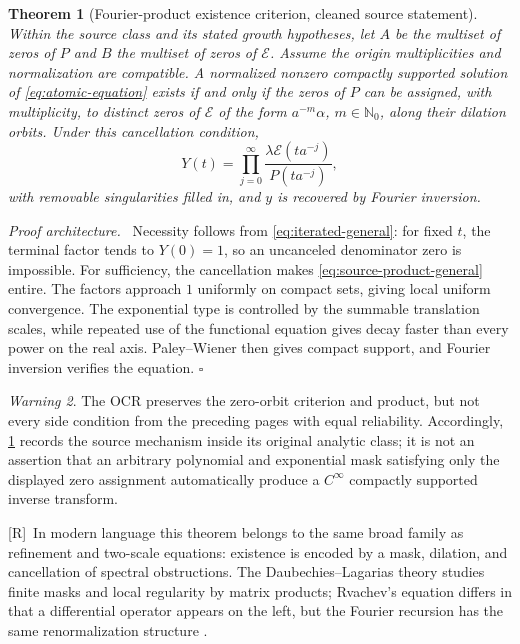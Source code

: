 \documentclass[11pt,oneside]{article}
\newtheorem{theorem}{Theorem}[section]
\theoremstyle{definition}
\theoremstyle{remark}
\newtheorem{warning}[theorem]{Warning}
\newcommand{\N}{\mathbb N}
\newcommand{\Rmark}{\textcolor{sourceblue}{\textsf{[R]}}}
\newenvironment{proofidea}{\par\smallskip\noindent\textit{Proof architecture.}\ }{\hfill$\square$\par\smallskip}
\begin{document}
\begin{theorem}[Fourier-product existence criterion, cleaned source statement]
\label{thm:source-existence}
Within the source class and its stated growth hypotheses, let $A$ be the multiset of zeros
of $P$ and $B$ the multiset of zeros of $\mathcal E$.  Assume the origin multiplicities and
normalization are compatible.  A normalized nonzero compactly supported solution of
\eqref{eq:atomic-equation} exists if and only if the zeros of
$P$ can be assigned, with multiplicity, to distinct zeros of $\mathcal E$ of the form
$a^{-m}\alpha$, $m\in\N_0$, along their dilation orbits.  Under this cancellation condition,
\begin{equation}
 Y(t)=\prod_{j=0}^{\infty}
       \frac{\lambda\mathcal E(ta^{-j})}{P(ta^{-j})},
 \tag{S3.8}
 \label{eq:source-product-general}
\end{equation}
with removable singularities filled in, and $y$ is recovered by Fourier inversion.
\end{theorem}

\begin{proofidea}
Necessity follows from \eqref{eq:iterated-general}: for fixed $t$, the terminal factor tends
to $Y(0)=1$, so an uncanceled denominator zero is impossible.  For sufficiency, the
cancellation makes \eqref{eq:source-product-general} entire.  The factors approach $1$
uniformly on compact sets, giving local uniform convergence.  The exponential type is
controlled by the summable translation scales, while repeated use of the functional equation
gives decay faster than every power on the real axis.  Paley--Wiener then gives compact
support, and Fourier inversion verifies the equation.
\end{proofidea}

\begin{warning}
The OCR preserves the zero-orbit criterion and product, but not every side condition from the
preceding pages with equal reliability.  Accordingly, \cref{thm:source-existence} records the
source mechanism inside its original analytic class; it is not an assertion that an arbitrary
polynomial and exponential mask satisfying only the displayed zero assignment automatically
produce a $C^\infty$ compactly supported inverse transform.
\end{warning}

\Rmark\ In modern language this theorem belongs to the same broad family as refinement and
two-scale equations: existence is encoded by a mask, dilation, and cancellation of spectral
obstructions.  The Daubechies--Lagarias theory studies finite masks and local regularity by
matrix products; Rvachev's equation differs in that a differential operator appears on the
left, but the Fourier recursion has the same renormalization structure
\cite{daubechieslagarias1,daubechieslagarias2}.
\end{document}
